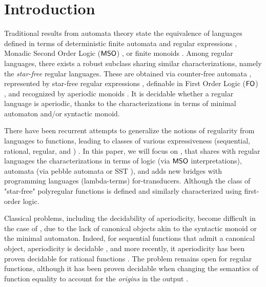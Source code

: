 \section{Introduction}
\label{introduction:sec}

Traditional results from automata theory state the equivalence of languages
defined in terms of deterministic finite automata and regular expressions
\cite{kleene1956representation}, Monadic Second Order Logic ($\mathsf{MSO}$)
\cite{buchi1960weak}, or finite monoids \cite{schutzenberger1961definition}.
Among regular languages, there exists a robust subclass sharing similar
characterizations, namely the \emph{star-free} regular languages. These are
obtained via counter-free automata \cite{mcnaughton1971counter}, represented by
star-free regular expressions \cite{schutzenberger1965finite}, definable in
First Order Logic ($\mathsf{FO}$) \cite{perrin1986first}, and recognized by aperiodic
monoids \cite{schutzenberger1965finite}. It is decidable whether a regular
language is aperiodic, thanks to the characterizations in terms of minimal
automaton and/or syntactic monoid.

There have been recurrent attempts to generalize the notions of regularity from
languages to functions, leading to classes of various expressiveness
(sequential, rational, regular, and ) \cite[see,
e.g.][]{bojanczyk2019string}. In this paper, we will focus on , that shares with regular languages the characterizations in terms
of logic (via $\mathsf{MSO}$ interpretations), automata (via pebble automata or SST
\cite{}), and adds new bridges with programming languages (lambda-terms)
for-transducers. Although the class of "star-free" polyregular functions is
defined and similarly characterized using first-order logic.

Classical problems, including the decidability of aperiodicity, become
difficult in the case of , due to the lack of
canonical objects akin to the syntactic monoid or the minimal automaton.
Indeed, for sequential functions that admit a canonical object, aperiodicity is
decidable \cite{choffrut03}, and more recently, it aperiodicity has been proven
decidable for rational functions
\cite{filiot2016aperiodicity,filiot2018canonical}. The problem remains open for
regular functions, although it has been proven decidable when changing the
semantics of function equality to account for the \emph{origins} in the output
\cite{bojanczyk14}.

